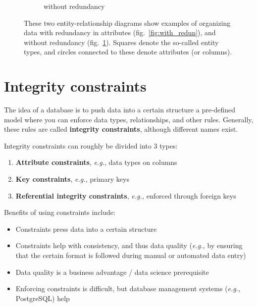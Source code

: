 \documentclass[11pt]{article}
\begin{document}
\begin{figure}[hbt!]
\begin{subfigure}[t]{.48\textwidth}
            \caption{without redundancy}
            \label{fig:without_redun}
        \end{subfigure}
        \caption{These two entity-relationship diagrams show examples of organizing data with redundancy in attributes (fig.~\ref{fig:with_redun}), and without redundancy (fig.~\ref{fig:without_redun}).
        Squares denote the so-called entity types, and circles connected to these denote attributes (or columns).}
        \label{fig:ent_rel_diag}
    \end{figure}


    \section{Integrity constraints} \label{sec:constraints}

    The idea of a database is to push data into a certain structure \textemdash a pre-defined model \textemdash where you can enforce data types, relationships, and other rules.
    Generally, these rules are called \textbf{integrity constraints}, although different names exist.

    \vspace{5mm}

    Integrity constraints can roughly be divided into 3 types:

    \begin{enumerate}
        \item \textbf{Attribute constraints}, \textit{e.g.}, data types on columns
        \item \textbf{Key constraints}, \textit{e.g.,} primary keys
        \item \textbf{Referential integrity constraints}, \textit{e.g.,} enforced through foreign keys
    \end{enumerate}

    Benefits of using constraints include:

    \begin{itemize}
        \item Constraints press data into a certain structure
        \item Constraints help with consistency, and thus data quality (\textit{e.g.,} by ensuring that the certain format is followed during manual or automated data entry)
        \item Data quality is a business advantage / data science prerequisite
        \item Enforcing constraints is difficult, but database management systems (\textit{e.g.,} PostgreSQL) help
    \end{itemize}
\end{document}
